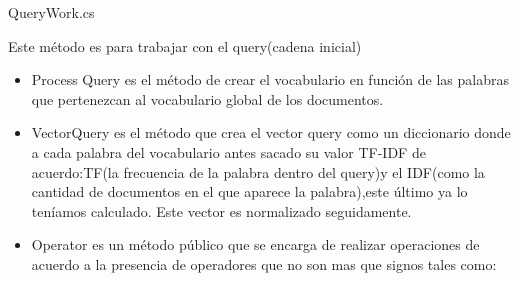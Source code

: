 \begin{frame}[fragile]{QueryWork.cs}


  Este método es para trabajar con el query(cadena inicial)
  \begin{itemize}
      \item Process Query es el método de crear el vocabulario en función de las palabras
      que pertenezcan al vocabulario global de los documentos.
      \item VectorQuery es el método que crea el vector query como un diccionario donde
      a cada palabra del vocabulario  antes sacado su valor TF-IDF de acuerdo:TF(la
      frecuencia de la palabra dentro del query)y el IDF(como la cantidad de
      documentos en el que aparece la palabra),este \'ultimo  ya lo teníamos calculado.
      Este vector es normalizado seguidamente.
      \item Operator es un método p\'ublico que se encarga de realizar operaciones de
      acuerdo a la presencia de operadores que no son mas que signos tales como:
  \end{itemize}
  \end{frame}
    
